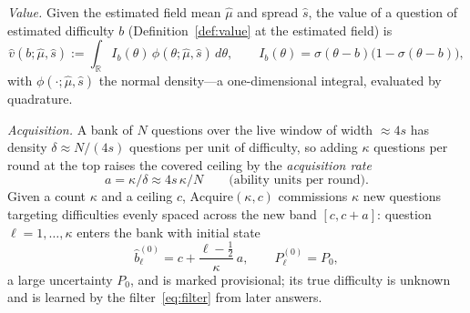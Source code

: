 \documentclass[11pt]{article}
\newcommand{\sigm}{\sigma}
\newcommand{\R}{\mathbb{R}}
\newcommand{\Acquire}{\mathrm{Acquire}}
\theoremstyle{plain}
\theoremstyle{definition}
\theoremstyle{remark}
\begin{document}
\textit{Value.} Given the estimated field mean $\hat\mu$ and spread $\hat s$, the
value of a question of estimated difficulty $b$ (Definition~\ref{def:value} at the
estimated field) is
\begin{equation}
\hat v(b;\hat\mu,\hat s):=\int_{\R}I_b(\theta)\,\phi(\theta;\hat\mu,\hat s)\,d\theta,
\qquad
I_b(\theta)=\sigm(\theta-b)\bigl(1-\sigm(\theta-b)\bigr),
\label{eq:valueop}
\end{equation}
with $\phi(\cdot;\hat\mu,\hat s)$ the normal density---a one-dimensional integral,
evaluated by quadrature.

\textit{Acquisition.} A bank of $N$ questions over the live window of width
$\approx 4s$ has density $\delta\approx N/(4s)$ questions per unit of difficulty, so
adding $\kappa$ questions per round at the top raises the covered ceiling by the
\emph{acquisition rate}
\begin{equation}
a=\kappa/\delta\approx 4s\,\kappa/N\qquad\text{(ability units per round)}.
\label{eq:acqrate}
\end{equation}
Given a count $\kappa$ and a ceiling $c$, $\Acquire(\kappa,c)$ commissions $\kappa$
new questions targeting difficulties evenly spaced across the new band $[c,c+a]$:
question $\ell=1,\dots,\kappa$ enters the bank with initial state
\begin{equation}
\hat b^{(0)}_\ell=c+\frac{\ell-\frac12}{\kappa}\,a,\qquad P^{(0)}_\ell=P_0,
\label{eq:acqinit}
\end{equation}
a large uncertainty $P_0$, and is marked provisional; its true difficulty is unknown
and is learned by the filter~\eqref{eq:filter} from later answers.
\end{document}
